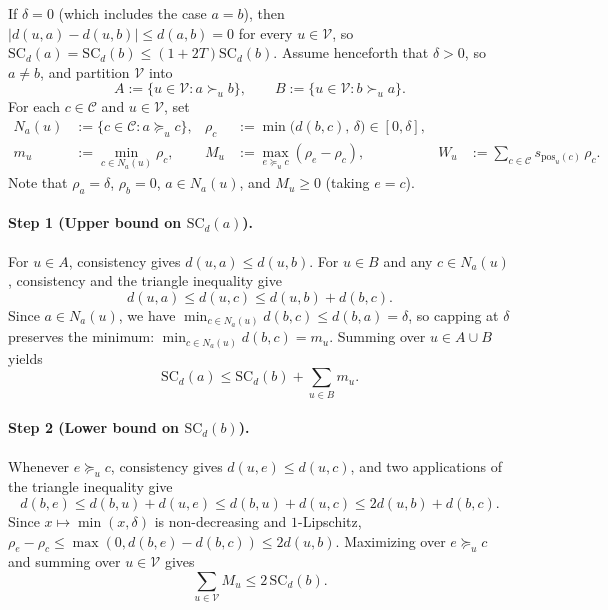 \documentclass[11pt]{article}
\newcommand{\SC}{\mathrm{SC}}
\newcommand{\pos}{\mathrm{pos}}
\begin{document}
If $\delta = 0$ (which includes the case $a = b$), then $|d(u, a) - d(u, b)| \le d(a, b) = 0$ for every $u \in \mathcal{V}$, so $\SC_d(a) = \SC_d(b) \le (1 + 2T)\SC_d(b)$. Assume henceforth that $\delta > 0$, so $a \neq b$, and partition $\mathcal{V}$ into
\[
A := \{u \in \mathcal{V} : a \succ_u b\}, \qquad B := \{u \in \mathcal{V} : b \succ_u a\}.
\]
For each $c \in \mathcal{C}$ and $u \in \mathcal{V}$, set
\begin{align*}
N_a(u) &:= \{c \in \mathcal{C} : a \succcurlyeq_u c\}, &
\rho_c &:= \min\bigl(d(b, c),\, \delta\bigr) \in [0, \delta], \\
m_u &:= \min_{c \in N_a(u)} \rho_c, &
M_u &:= \max_{e \succcurlyeq_u c} (\rho_e - \rho_c), &
W_u &:= \sum_{c \in \mathcal{C}} s_{\pos_u(c)}\,\rho_c.
\end{align*}
Note that $\rho_a = \delta$, $\rho_b = 0$, $a \in N_a(u)$, and $M_u \ge 0$ (taking $e = c$).

\paragraph{Step 1 (Upper bound on $\SC_d(a)$).}
For $u \in A$, consistency gives $d(u, a) \le d(u, b)$. For $u \in B$ and any $c \in N_a(u)$, consistency and the triangle inequality give
\[
d(u, a) \le d(u, c) \le d(u, b) + d(b, c).
\]
Since $a \in N_a(u)$, we have $\min_{c \in N_a(u)} d(b, c) \le d(b, a) = \delta$, so capping at $\delta$ preserves the minimum: $\min_{c \in N_a(u)} d(b, c) = m_u$. Summing over $u \in A \cup B$ yields
\begin{equation}\label{eq:step1}
\SC_d(a) \le \SC_d(b) + \sum_{u \in B} m_u.
\end{equation}

\paragraph{Step 2 (Lower bound on $\SC_d(b)$).}
Whenever $e \succcurlyeq_u c$, consistency gives $d(u, e) \le d(u, c)$, and two applications of the triangle inequality give
\[
d(b, e) \le d(b, u) + d(u, e) \le d(b, u) + d(u, c) \le 2d(u, b) + d(b, c).
\]
Since $x \mapsto \min(x, \delta)$ is non-decreasing and $1$-Lipschitz, $\rho_e - \rho_c \le \max(0, d(b, e) - d(b, c)) \le 2d(u, b)$. Maximizing over $e \succcurlyeq_u c$ and summing over $u \in \mathcal{V}$ gives
\begin{equation}\label{eq:step2}
\sum_{u \in \mathcal{V}} M_u \le 2\,\SC_d(b).
\end{equation}
\end{document}
